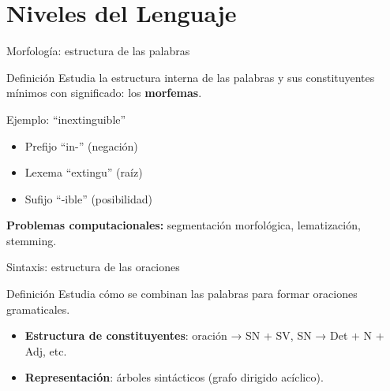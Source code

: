 \documentclass[aspectratio=169, 10pt, xcolor=table]{beamer}
\begin{document}
\section{Niveles del Lenguaje}

\begin{frame}{Morfología: estructura de las palabras}
    \begin{block}{Definición}
        Estudia la estructura interna de las palabras y sus constituyentes mínimos con significado: los \textbf{morfemas}.
    \end{block}
    \begin{exampleblock}{Ejemplo: ``inextinguible''}
        \begin{itemize}
            \item Prefijo ``in-'' (negación)
            \item Lexema ``extingu'' (raíz)
            \item Sufijo ``-ible'' (posibilidad)
        \end{itemize}
    \end{exampleblock}
    \textbf{Problemas computacionales:} segmentación morfológica, lematización, stemming.
\end{frame}

\begin{frame}{Sintaxis: estructura de las oraciones}
    \begin{block}{Definición}
        Estudia cómo se combinan las palabras para formar oraciones gramaticales.
    \end{block}
    \begin{itemize}
        \item \textbf{Estructura de constituyentes}: oración → SN + SV, SN → Det + N + Adj, etc.
        \item \textbf{Representación}: árboles sintácticos (grafo dirigido acíclico).
    \end{itemize}
\end{frame}
\end{document}
